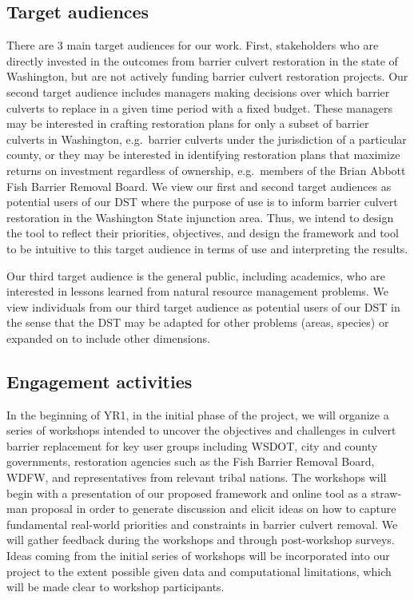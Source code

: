 \documentclass[12pt]{elsarticle}
\begin{document}
\subsection{Target audiences}

There are 3 main target audiences for our work. First, stakeholders who are directly invested in the outcomes from barrier culvert restoration in the state of Washington, but are not actively funding barrier culvert restoration projects. Our second target audience includes managers making decisions over which barrier culverts to replace in a given time period with a fixed budget. These managers may be interested in crafting restoration plans for only a subset of barrier culverts in Washington, e.g.\ barrier culverts under the jurisdiction of a particular county, or they may be interested in identifying restoration plans that maximize returns on investment regardless of ownership, e.g.\ members of the Brian Abbott Fish Barrier Removal Board. We view our first and second target audiences as potential users of our DST where the purpose of use is to inform barrier culvert restoration in the Washington State injunction area. Thus, we intend to design the tool to reflect their priorities, objectives, and design the framework and tool to be intuitive to this target audience in terms of use and interpreting the results.

Our third target audience is the general public, including academics, who are interested in lessons learned from natural resource management problems. We view individuals from our third target audience as potential users of our DST in the sense that the DST may be adapted for other problems (areas, species) or expanded on to include other dimensions. 

\subsection{Engagement activities}

In the beginning of YR1, in the initial phase of the project, we will organize a series of workshops intended to uncover the objectives and challenges in culvert barrier replacement for key user groups including WSDOT, city and county governments, restoration agencies such as the Fish Barrier Removal Board, WDFW, and representatives from relevant tribal nations. The workshops will begin with a presentation of our proposed framework and online tool as a straw-man proposal in order to generate discussion and elicit ideas on how to capture fundamental real-world priorities and constraints in barrier culvert removal. We will gather feedback during the workshops and through post-workshop surveys. Ideas coming from the initial series of workshops will be incorporated into our project to the extent possible given data and computational limitations, which will be made clear to workshop participants.
\end{document}
